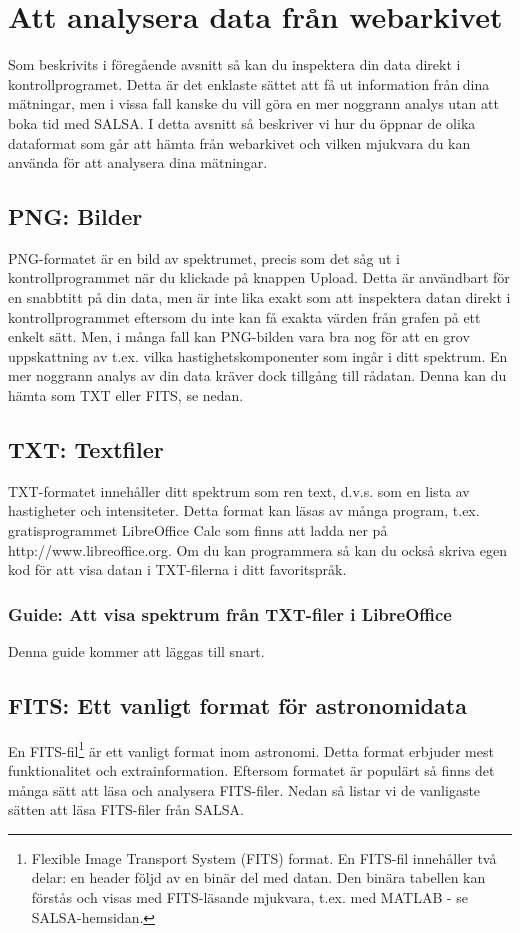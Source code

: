 \section{Att analysera data från webarkivet}
\label{sect:archiveprocess}
Som beskrivits i föregående avsnitt så kan du inspektera din data direkt i
kontrollprogramet. Detta är det enklaste sättet att få ut information
från dina mätningar, men i vissa fall kanske du vill göra en mer noggrann analys
utan att boka tid med SALSA. I detta avsnitt så beskriver vi hur du öppnar
de olika dataformat som går att hämta från webarkivet och vilken mjukvara
du kan använda för att analysera dina mätningar.

\subsection{PNG: Bilder}
PNG-formatet är en bild av spektrumet, precis som det såg ut i kontrollprogrammet
när du klickade på knappen Upload. Detta är användbart för en snabbtitt på din data,
men är inte lika exakt som att inspektera datan direkt i kontrollprogrammet
eftersom du inte kan få exakta värden från grafen på ett enkelt sätt. 
Men, i många fall kan PNG-bilden vara bra nog för att en grov uppskattning
av t.ex. vilka hastighetskomponenter som ingår i ditt spektrum. En mer
noggrann analys av din data kräver dock tillgång till rådatan. Denna 
kan du hämta som TXT eller FITS, se nedan. 

\subsection{TXT: Textfiler}
TXT-formatet innehåller ditt spektrum som ren text, d.v.s. som en lista av
hastigheter och intensiteter. Detta format kan läsas av många program, t.ex. 
gratisprogrammet LibreOffice Calc som finns att ladda ner på 
http://www.libreoffice.org.  Om du kan programmera så kan du också skriva egen
kod för att visa datan i TXT-filerna i ditt favoritspråk. 
\subsubsection{Guide: Att visa spektrum från TXT-filer i LibreOffice}
Denna guide kommer att läggas till snart.

\subsection{FITS: Ett vanligt format för astronomidata}
En FITS-fil\footnote{Flexible Image Transport System (FITS) format.  En FITS-fil
	innehåller två delar: en header följd av en binär del med datan. Den binära
	tabellen kan förstås och visas med FITS-läsande mjukvara, t.ex. med MATLAB - se
	SALSA-hemsidan. } är ett vanligt format inom astronomi. Detta format
	erbjuder mest funktionalitet och extrainformation. Eftersom formatet är populärt
	så finns det många sätt att läsa och analysera FITS-filer. Nedan så listar
	vi de vanligaste sätten att läsa FITS-filer från SALSA.

